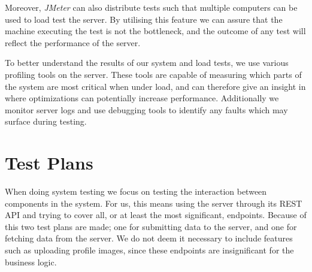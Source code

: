 Moreover, \textit{JMeter} can also distribute tests such that multiple computers can be used to load test the server.
By utilising this feature we can assure that the machine executing the test is not the bottleneck, and the outcome of any test will reflect the performance of the server.

\bigskip
To better understand the results of our system and load tests, we use various profiling tools on the server.
These tools are capable of measuring which parts of the system are most critical when under load, and can therefore give an insight in where optimizations can potentially increase performance.
Additionally we monitor server logs and use debugging tools to identify any faults which may surface during testing.

\section{Test Plans}
When doing system testing we focus on testing the interaction between components in the system.
For us, this means using the server through its REST API and trying to cover all, or at least the most significant, endpoints.
Because of this two test plans are made; one for submitting data to the server, and one for fetching data from the server.
We do not deem it necessary to include features such as uploading profile images, since these endpoints are insignificant for the business logic.

